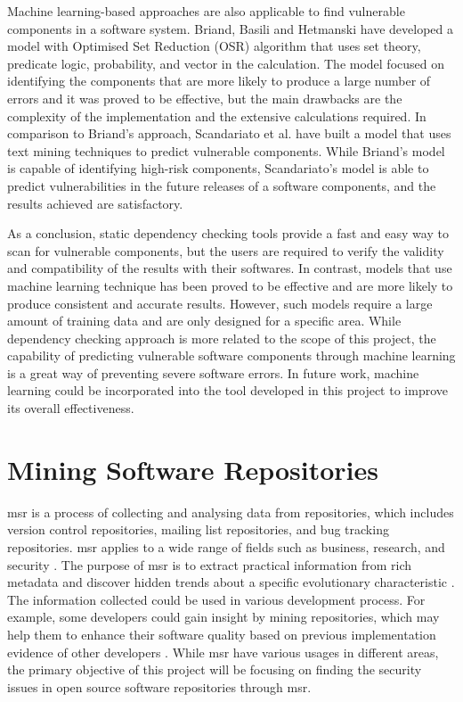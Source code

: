 \documentclass[12pt, a4paper]{report}
\begin{document}
Machine learning-based approaches are also applicable to find vulnerable components in a software
system. Briand, Basili and Hetmanski \cite{briand_1993} have developed a model with Optimised Set
Reduction (OSR) algorithm that uses set theory, predicate logic, probability, and vector in the
calculation. The model focused on identifying the components that are more likely to produce a large
number of errors and it was proved to be effective, but the main drawbacks are the complexity of the
implementation and the extensive calculations required. In comparison to Briand's approach,
Scandariato et al. \cite{scandariato_2014} have built a model that uses text mining techniques to
predict vulnerable components. While Briand's model is capable of identifying high-risk components,
Scandariato's model is able to predict vulnerabilities in the future releases of a software
components, and the results achieved are satisfactory.

As a conclusion, static dependency checking tools provide a fast and easy way to scan for vulnerable
components, but the users are required to verify the validity and compatibility of the results with
their softwares. In contrast, models that use machine learning technique has been proved to be
effective and are more likely to produce consistent and accurate results. However, such models
require a large amount of training data and are only designed for a specific area. While dependency
checking approach is more related to the scope of this project, the capability of predicting
vulnerable software components through machine learning is a great way of preventing severe software
errors. In future work, machine learning could be incorporated into the tool developed in this
project to improve its overall effectiveness.

\section{Mining Software Repositories}
\acrfull{msr} is a process of collecting and analysing data from repositories, which includes
version control repositories, mailing list repositories, and bug tracking repositories.
\acrshort{msr} applies to a wide range of fields such as business, research, and security
\cite{poncin_2011}. The purpose of \acrshort{msr} is to extract practical information from rich
metadata and discover hidden trends about a specific evolutionary characteristic \cite{kagdi_2007}.
The information collected could be used in various development process. For example, some developers
could gain insight by mining repositories, which may help them to enhance their software quality
based on previous implementation evidence of other developers \cite{hassan_2008}. While
\acrshort{msr} have various usages in different areas, the primary objective of this project will be
focusing on finding the security issues in open source software repositories through \acrshort{msr}.
\end{document}
